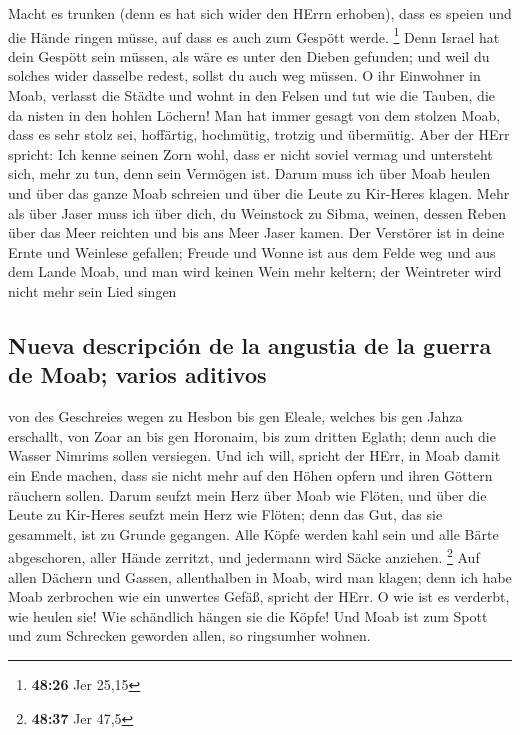  Macht es trunken (denn es hat sich wider den HErrn
erhoben), dass es speien und die Hände ringen müsse, auf dass es auch
zum Gespött werde. \footnote{\textbf{48:26} Jer 25,15} 
Denn Israel hat dein Gespött sein müssen, als wäre es unter den Dieben
gefunden; und weil du solches wider dasselbe redest, sollst du auch weg
müssen.  O ihr Einwohner in Moab, verlasst die Städte und
wohnt in den Felsen und tut wie die Tauben, die da nisten in den hohlen
Löchern!  Man hat immer gesagt von dem stolzen Moab, dass
es sehr stolz sei, hoffärtig, hochmütig, trotzig und übermütig.
 Aber der HErr spricht: Ich kenne seinen Zorn wohl, dass
er nicht soviel vermag und untersteht sich, mehr zu tun, denn sein
Vermögen ist.  Darum muss ich über Moab heulen und über
das ganze Moab schreien und über die Leute zu Kir-Heres klagen.
 Mehr als über Jaser muss ich über dich, du Weinstock zu
Sibma, weinen, dessen Reben über das Meer reichten und bis ans Meer
Jaser kamen. Der Verstörer ist in deine Ernte und Weinlese gefallen;
 Freude und Wonne ist aus dem Felde weg und aus dem Lande
Moab, und man wird keinen Wein mehr keltern; der Weintreter wird nicht
mehr sein Lied singen

\hypertarget{nueva-descripciuxf3n-de-la-angustia-de-la-guerra-de-moab-varios-aditivos}{%
\subsection{Nueva descripción de la angustia de la guerra de Moab;
varios
aditivos}\label{nueva-descripciuxf3n-de-la-angustia-de-la-guerra-de-moab-varios-aditivos}}

 von des Geschreies wegen zu Hesbon bis gen Eleale,
welches bis gen Jahza erschallt, von Zoar an bis gen Horonaim, bis zum
dritten Eglath; denn auch die Wasser Nimrims sollen versiegen.
 Und ich will, spricht der HErr, in Moab damit ein Ende
machen, dass sie nicht mehr auf den Höhen opfern und ihren Göttern
räuchern sollen.  Darum seufzt mein Herz über Moab wie
Flöten, und über die Leute zu Kir-Heres seufzt mein Herz wie Flöten;
denn das Gut, das sie gesammelt, ist zu Grunde gegangen. 
Alle Köpfe werden kahl sein und alle Bärte abgeschoren, aller Hände
zerritzt, und jedermann wird Säcke anziehen. \footnote{\textbf{48:37}
  Jer 47,5}  Auf allen Dächern und Gassen, allenthalben
in Moab, wird man klagen; denn ich habe Moab zerbrochen wie ein unwertes
Gefäß, spricht der HErr.  O wie ist es verderbt, wie
heulen sie! Wie schändlich hängen sie die Köpfe! Und Moab ist zum Spott
und zum Schrecken geworden allen, so ringsumher wohnen.

